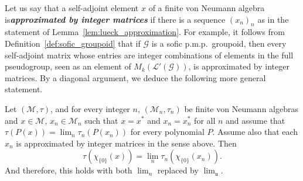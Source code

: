 \documentclass[AHL,Unicode,longabstracts,published]{cedram}
\newcommand{\defin}[1]{\textbf{\emph{#1}}}
\newcommand{\cM}{\mathcal{M}}
\newcommand{\LL}{\mathcal{L}}
\newcommand{\cg}{\mathcal{G}}
\newcommand{\ul}{\mathfrak{u}}
\newcommand{\pmp}{p.m.p.\ }
\begin{document}
Let us say that a self-adjoint element $x$ of a finite von Neumann algebra is\linebreak\defin{approximated by integer matrices} if there is a sequence $(x_n)_n$ as in the statement of Lemma~\ref{lem:lueck_approximation}. For example, it follows from Definition~\ref{def:sofic_groupoid} that if $\cg$ is a sofic \pmp groupoid, then every self-adjoint matrix whose entries are integer combinations of elements in the full pseudogroup, seen as an element of $M_k(\LL'(\cg))$, is approximated by integer matrices. By a diagonal argument, we deduce the following more general statement.

\begin{lemm}\label{lem:lueck_approximation_sofic}
Let $(\cM,\tau)$, and for every integer $n$, $(\cM_n,\tau_n)$ be finite von Neumann algebras and $x \in \cM$, $x_n \in \cM_n$ such that $x=x^*$ and $x_n=x_n^*$ for all $n$ and assume that $\tau(P(x)) = \lim_n \tau_n(P(x_n))$ for every polynomial $P$. Assume also that each $x_n$ is approximated by integer matrices in the sense above. Then
\[
\tau\left(\chi_{\{0\}}(x)\right) = \lim_n\tau_n\left(\chi_{\{0\}}(x_n)\right).
\]
And therefore, this holds with both $\lim_n$ replaced by $\lim_\ul$.
\end{lemm}
\end{document}
